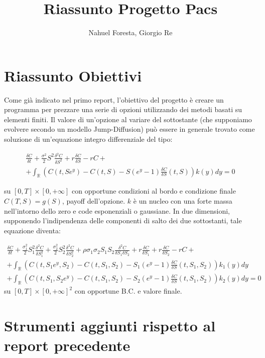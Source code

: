 \documentclass[a4paper,10pt]{article}
\title{Riassunto Progetto Pacs}
\author{Nahuel Foresta, Giorgio Re}
\newcommand{\der}[2]{\frac{\delta #1}{\delta #2}}
\newcommand{\dder}[2]{\frac{\delta^2 #1}{\delta #2^2}}
\newcommand{\dmix}[3]{\frac{\delta^2 #1}{\delta #2 \delta #3}}
\begin{document}
\maketitle

\section{Riassunto Obiettivi}

Come gi\`a indicato nel primo report, l'obiettivo del progetto è creare un programma per prezzare una serie di opzioni utilizzando dei metodi basati su elementi finiti. Il valore di un'opzione al variare del sottostante (che supponiamo evolvere secondo un modello Jump-Diffusion) può essere in generale trovato come soluzione di un'equazione integro differenziale del tipo:

\begin{multline}
\der{C}{t}+\frac{\sigma^2}{2}S^2\dder{C}{S}+r\der{C}{S}-rC+\\+ \int_\mathbb{R}\left(C(t,Se^y)-C(t,S)-S(e^y-1)\der{C}{S}(t,S)\right)k(y)dy=0
\label{eq:1d}
\end{multline}

su $[0,T]\times[0,+\infty]$ con opportune condizioni al bordo e condizione finale $C(T,S)=g(S)$, payoff dell'opzione. $k$ è un nucleo con una forte massa nell'intorno dello zero e code esponenziali o gaussiane.
In due dimensioni, supponendo l'indipendenza delle componenti di salto dei due sottostanti, tale equazione diventa:


\begin{multline}
 \der{C}{t}+\frac{\sigma_1^2}{2}S_1^2\dder{C}{S_1}+\frac{\sigma_2^2}{2}S_2^2\dder{C}{S_2}+\rho\sigma_1\sigma_2 S_1 S_2 \dmix{C}{S_1}{S_2}+
 r\der{C}{S_1}+r\der{C}{S_2}-rC+ \\
 + \int_\mathbb{R}\left(C(t,S_1e^{y},S_2)-C(t,S_1,S_2)-S_1(e^y-1)\der{C}{S}(t,S_1,S_2)\right)k_1(y)dy\\
 + \int_\mathbb{R}\left(C(t,S_1,S_2e^{y})-C(t,S_1,S_2)-S_2(e^y-1)\der{C}{S}(t,S_1,S_2)\right)k_2(y)dy=0
\label{eq:2d}
\end{multline}
su $[0,T]\times[0,+\infty]^2$ con opportune B.C. e valore finale.

\section{Strumenti aggiunti rispetto al report precedente}
\end{document}
